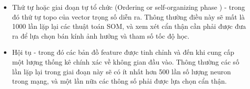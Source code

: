 \begin{enumerate}
	  \begin{itemize}
	    \item Thứ tự hoặc giai đoạn tự tổ chức (Ordering or self-organizing phase )
	    - trong đó thứ tự topo của vector trọng số diễn ra. Thông thường điều này
	    sẽ mất là 1000 lần lặp lại các thuật toán SOM, và xem xét cẩn thận cần phải
	    được đưa ra để lựa chọn bán kính ảnh hưởng và tham số tốc độ học.
	    \item Hội tụ - trong đó các bản đồ feature được tinh chỉnh và đến khi cung
	    cấp một lượng thống kê chính xác về không gian đầu vào. Thông thường các số lần lặp lại trong giai đoạn này sẽ có ít nhất hơn 500 lần số lượng neuron trong mạng, và một lần nữa các thông số phải được lựa chọn cẩn thận.
	  \end{itemize}
	\end{enumerate}
